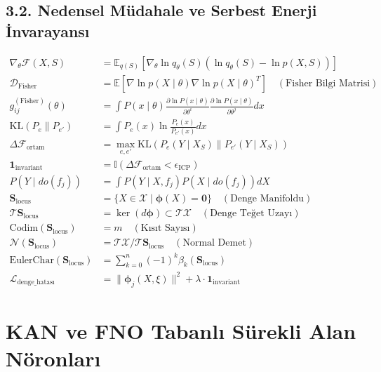 \documentclass[11pt, a4paper]{article}
\begin{document}
\subsection{3.2. Nedensel Müdahale ve Serbest Enerji İnvarayansı}
\begin{align}
\nabla_{\theta} \mathcal{F}(X, S) &= \mathbb{E}_{q(S)} \left[ \nabla_\theta \ln q_\theta(S) (\ln q_\theta(S) - \ln p(X, S)) \right] \\
\mathcal{D}_{\text{Fisher}} &= \mathbb{E} \left[ \nabla \ln p(X \mid \theta) \nabla \ln p(X \mid \theta)^T \right] \quad (\text{Fisher Bilgi Matrisi}) \\
g_{ij}^{(\text{Fisher})}(\theta) &= \int P(x \mid \theta) \frac{\partial \ln P(x \mid \theta)}{\partial \theta^i} \frac{\partial \ln P(x \mid \theta)}{\partial \theta^j} dx \\
\text{KL}(P_e \parallel P_{e'}) &= \int P_e(x) \ln \frac{P_e(x)}{P_{e'}(x)} dx \\
\Delta \mathcal{F}_{\text{ortam}} &= \max_{e, e'} \text{KL}(P_e(Y \mid X_S) \parallel P_{e'}(Y \mid X_S)) \\
\mathbf{1}_{\text{invariant}} &= \mathbb{I}\left( \Delta \mathcal{F}_{\text{ortam}} < \epsilon_{\text{ICP}} \right) \\
P(Y \mid do(f_j)) &= \int P(Y \mid X, f_j) P(X \mid do(f_j)) dX \\
\mathbf{S}_{\text{locus}} &= \{ X \in \mathcal{X} \mid \bm{\phi}(X) = \mathbf{0} \} \quad (\text{Denge Manifoldu}) \\
\mathcal{T}\mathbf{S}_{\text{locus}} &= \ker(d\bm{\phi}) \subset \mathcal{T}\mathcal{X} \quad (\text{Denge Teğet Uzayı}) \\
\text{Codim}(\mathbf{S}_{\text{locus}}) &= m \quad (\text{Kısıt Sayısı}) \\
\mathcal{N}(\mathbf{S}_{\text{locus}}) &= \mathcal{T}\mathcal{X} / \mathcal{T}\mathbf{S}_{\text{locus}} \quad (\text{Normal Demet}) \\
\text{EulerChar}(\mathbf{S}_{\text{locus}}) &= \sum_{k=0}^n (-1)^k \beta_k(\mathbf{S}_{\text{locus}}) \\
\mathcal{L}_{\text{denge\_hatası}} &= \| \bm{\phi}_j(X, \xi) \|^2 + \lambda \cdot \mathbf{1}_{\text{invariant}}
\end{align}

\section{KAN ve FNO Tabanlı Sürekli Alan Nöronları}
\end{document}

